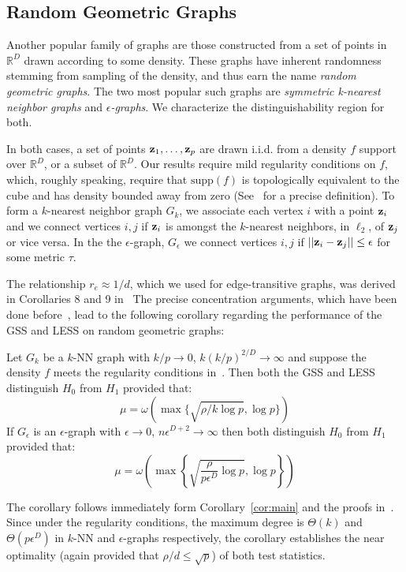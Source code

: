 \subsection{Random Geometric Graphs}
Another popular family of graphs are those constructed from a set of points in $\mathbb{R}^D$ drawn according to some density. 
These graphs have inherent randomness stemming from sampling of the density, and thus earn the name \emph{random geometric graphs}.
The two most popular such graphs are \emph{symmetric k-nearest neighbor graphs} and \emph{$\epsilon$-graphs}.
We characterize the distinguishability region for both. 

In both cases, a set of points $\mathbf{z}_1, \ldots, \mathbf{z}_p$ are drawn i.i.d. from a density $f$ support over $\mathbb{R}^D$, or a subset of $\mathbb{R}^D$. 
Our results require mild regularity conditions on $f$, which, roughly speaking, require that $\textrm{supp}(f)$ is topologically equivalent to the cube and has density bounded away from zero (See~\cite{vonluxburg2010} for a precise definition). 
To form a $k$-nearest neighbor graph $G_k$, we associate each vertex $i$ with a point $\mathbf{z}_i$ and we connect vertices $i,j$ if $\mathbf{z}_i$ is amongst the $k$-nearest neighbors, in $\ell_2$, of $\mathbf{z}_j$ or vice versa.
In the the $\epsilon$-graph, $G_\epsilon$ we connect vertices $i,j$ if $||\mathbf{z}_i - \mathbf{z}_j|| \le \epsilon$ for some metric $\tau$. 

The relationship $r_e \approx 1/d$, which we used for edge-transitive graphs, was derived in Corollaries 8 and 9 in~\cite{vonluxburg2010}
The precise concentration arguments, which have been done before~\cite{sharpnack2012detecting}, lead to the following corollary regarding the performance of the GSS and LESS on random geometric graphs:
\begin{corollary}
Let $G_k$ be a $k$-NN graph with $k/p \rightarrow 0$, $k(k/p)^{2/D} \rightarrow \infty$ and suppose the density $f$ meets the regularity conditions in~\cite{vonluxburg2010}.
Then both the GSS and LESS distinguish $H_0$ from $H_1$ provided that:
\[
\mu = \omega\left(\max\{\sqrt{\rho/k\log p},\log p\}\right)
\]
If $G_\epsilon$ is an $\epsilon$-graph with $\epsilon \rightarrow 0$, $n\epsilon^{D+2}\rightarrow \infty$ then both distinguish $H_0$ from $H_1$ provided that:
\[
\mu = \omega\left(\max \left\{\sqrt{\frac{\rho}{p\epsilon^D} \log p}, \log p\right \}\right)
\]
\end{corollary}
The corollary follows immediately form Corollary~\ref{cor:main} and the proofs in~\cite{sharpnack2012detecting}.
Since under the regularity conditions, the maximum degree is $\Theta(k)$ and $\Theta(p\epsilon^D)$ in $k$-NN and $\epsilon$-graphs respectively, the corollary establishes the near optimality (again provided that $\rho/d \le \sqrt{p}$) of both test statistics.

